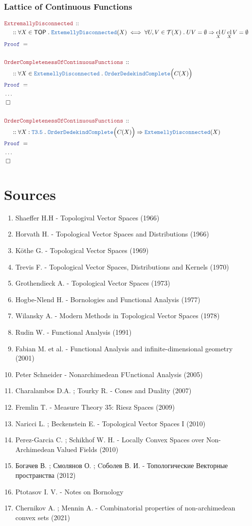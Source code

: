 \documentclass[12pt]{scrartcl}
\newcommand{\TYPE}[1]{\textcolor{NavyBlue}{\mathtt{#1}}}
\newcommand{\LOGIC}[1]{\textcolor{Blue}{\mathtt{#1}}}
\newcommand{\THM}[1]{\textcolor{Maroon}{\mathtt{#1}}}
\renewcommand{\.}{\; . \;}
\newcommand{\Theorem}[2]{& \THM{#1} \, :: \, #2 \\ & \Proof = \\ }
\newcommand{\NewLine}{\\ & \kern 1pc}
\newcommand{\Page}[1]{ \begin{align*} #1 \end{align*}   }
\newcommand{\NoProof}{ & \ldots \\ \EndProof}
\newcommand{\Imply}{\Rightarrow}
\newcommand{\QED}{\; \square}
\newcommand{\EndProof}{& \QED \\}
\newcommand{\Proof}{\LOGIC{Proof} \; }
\newcommand{\ED}{\TYPE{ExtemellyDisconnected}}
\DeclareMathOperator*{\cl}{cl}
\newcommand{\TOP}{\mathsf{TOP}}
\newcommand{\T}{\mathcal{T}}
\newcommand{\OComplete}{\TYPE{OrderDedekindComplete}}
\begin{document}
\subsubsection{Lattice of Continuous Functions}
\Page{
	\Theorem{ExtremallyDisconnected}
	{ 
		\NewLine ::		
		\forall X \in \TOP \.
		\ED(X) \iff 
		\forall U,V \in \T(X) \.
		UV = \emptyset 
		\Imply
		\cl_X U \cl_X V = \emptyset 
	}
	\\
	\Theorem{OrderCompletenessOfContinuousFunctions}
	{
		\NewLine ::		
		\forall X \in \ED \. 
		\OComplete\Big( C(X) \Big)
	}
	\NoProof
	\\
	\Theorem{OrderCompletenessOfContinuousFunctions}
	{
		\NewLine ::		
		\forall X : \TYPE{T3.5} \. 
		\OComplete\Big( C(X) \Big)
		\Imply
		\ED(X)
	}
	\NoProof
}
\newpage
\section*{Sources}
\begin{enumerate}
\item Shaeffer H.H - Topologival Vector Spaces (1966)
\item Horvath H. - Topological Vector Spaces and Distributions (1966)
\item K\"othe G. - Topological Vector Spaces (1969)
\item Trevis F.  - Topological Vector Spaces, Distributions and Kernels (1970)
\item Grothendieck A. - Topological Vector Spaces (1973)
\item Hogbe-Nlend H.  - Bornologies and Functional Analysis (1977)
\item Wilansky A. - Modern Methods in Topological Vector Spaces (1978) 
\item Rudin W.  - Functional Analysis (1991) 
\item Fabian M. et al.   - Functional Analysis and infinite-dimensional geometry (2001)
\item Peter Schneider - Nonarchimedean FUnctional Analysis (2005)
\item Charalambos D.A. ; Tourky R. - Cones and Duality (2007)
\item Fremlin T. - Measure Theory 35: Riesz Spaces (2009)
\item Naricci L. ; Beckenstein E. - Topological Vector Spaces I (2010)
\item Perez-Garcia C. ; Schikhof W. H. - Locally Convex Spaces over Non-Archimedean Valued Fields (2010)
\item Богачев В. ; Смолянов О. ; Cоболев В. И. -  Топологические Векторные пространства (2012)
\item Ptotasov I. V. - Notes on Bornology
\item Chernikov A. ; Mennin A.  -  Combinatorial properties of non-archimedean convex sets  (2021)
\end{enumerate}
\end{document}

